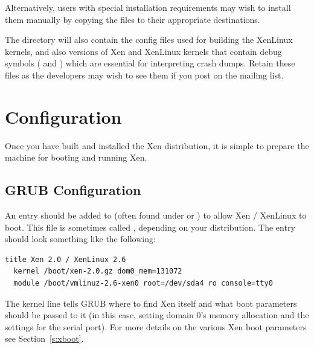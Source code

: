 \documentclass[11pt,twoside,final,openright]{report}
\begin{document}
Alternatively, users with special installation requirements may wish
to install them manually by copying the files to their appropriate
destinations.


The  directory will also contain the config files
used for building the XenLinux kernels, and also versions of Xen and
XenLinux kernels that contain debug symbols ( and
) which are essential for interpreting crash
dumps.  Retain these files as the developers may wish to see them if
you post on the mailing list.





\section{Configuration}
\label{s:configure}
Once you have built and installed the Xen distribution, it is 
simple to prepare the machine for booting and running Xen. 

\subsection{GRUB Configuration}

An entry should be added to  (often found under
 or ) to allow Xen / XenLinux to boot.
This file is sometimes called , depending on your
distribution.  The entry should look something like the following:

{\small
\begin{verbatim}
title Xen 2.0 / XenLinux 2.6
  kernel /boot/xen-2.0.gz dom0_mem=131072
  module /boot/vmlinuz-2.6-xen0 root=/dev/sda4 ro console=tty0
\end{verbatim}
}

The kernel line tells GRUB where to find Xen itself and what boot
parameters should be passed to it (in this case, setting domain 0's
memory allocation and the settings for the serial port). For more
details on the various Xen boot parameters see Section~\ref{s:xboot}. 
\end{document}
